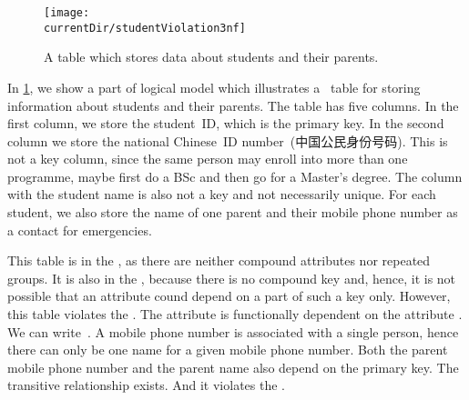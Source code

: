 %
\FloatBarrier%
%
\begin{figure}%
\centering%
%
\texttt{[image: \\currentDir/studentViolation3nf]}%
%
\caption{A table which stores data about students and their parents.}%
\label{fig:studentViolation3nf}%
\end{figure}%
%
%
%
%
%
%
%
%
%
%
%
%
In \cref{fig:studentViolation3nf}, we show a part of logical model which illustrates a \db\ table for storing information about students and their parents.
The table has five columns.
In the first column, we store the student~ID, which is the primary key.
In the second column we store the national Chinese~ID number~(中国公民身份号码).
This is not a key column, since the same person may enroll into more than one programme, maybe first do a BSc and then go for a Master's degree.
The column with the student name is also not a key and not necessarily unique.
For each student, we also store the name of one parent and their mobile phone number as a contact for emergencies.

This table is in the , as there are neither compound attributes nor repeated groups.
It is also in the , because there is no compound key and, hence, it is not possible that an attribute cound depend on a part of such a key only.
However, this table violates the .
The attribute  is functionally dependent on the attribute .
We can write~.
A mobile phone number is associated with a single person, hence there can only be one name for a given mobile phone number.
Both the parent mobile phone number and the parent name also depend on the primary key.
The transitive relationship  exists.
And it violates the .

